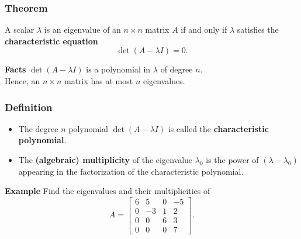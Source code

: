 




\begin{frame}[fragile]\frametitle{Theorem}

 A scalar $\lambda$ is an eigenvalue of an $n\times n$ matrix $A$ if and only if 
$\lambda$ satisfies the \textbf{characteristic equation} 
\[
 \det(A -\lambda I) = 0.
\]

\textbf{Facts}
$\det(A-\lambda I)$ is a polynomial in $\lambda$ of degree $n$.   \\ 
Hence, an $n\times n$ matrix has at most $n$ eigenvalues. 

\end{frame}


\begin{frame}[fragile]\frametitle{Definition}

\begin{itemize}
\item  The degree $n$ polynomial $\det(A-\lambda I)$ is called the \textbf{characteristic polynomial}.  
\item  The \textbf{(algebraic) multiplicity} of the eigenvalue $\lambda_0$ is the power of $(\lambda-\lambda_0)$ appearing in the factorization of the characteristic polynomial.
\end{itemize}

\textbf{Example}
Find the eigenvalues and their multiplicities of 
\[A = \left[ \begin{array}{rrrrr} 
 6 & 5 & 0 & -5 \\ 0 & -3 & 1 & 2 \\ 0 & 0 & 6 & 3 \\ 0& 0 & 0 & 7     
     \end{array} \right].
\]

\end{frame}